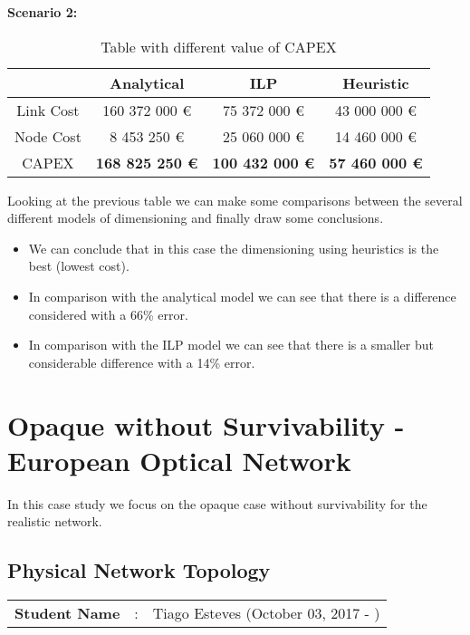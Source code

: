 \vspace{11pt}
\textbf{Scenario 2:}\\

\begin{table}[h!]
\centering
\begin{tabular}{| c | c | c | c |}
 \hline
   & Analytical & ILP & Heuristic \\
 \hline\hline
 Link Cost & 160 372 000 \euro & 75 372 000 \euro & 43 000 000 \euro \\
 Node Cost & 8 453 250 \euro & 25 060 000 \euro & 14 460 000 \euro \\
 CAPEX & \textbf{168 825 250 \euro} & \textbf{100 432 000 \euro} & \textbf{57 460 000 \euro} \\
 \hline
\end{tabular}
\caption{Table with different value of CAPEX }
\label{table_comparative_opaque_sur_ref_2}
\end{table}

\vspace{11pt}
Looking at the previous table we can make some comparisons between the several different models of dimensioning and finally draw some conclusions.

\begin{itemize}
  \item We can conclude that in this case the dimensioning using heuristics is the best (lowest cost).
  \item In comparison with the analytical model we can see that there is a difference considered with a 66\% error.
  \item In comparison with the ILP model we can see that there is a smaller but considerable difference with a 14\% error.
\end{itemize}




\newpage
\section{Opaque without Survivability - European Optical Network} \label{Realistic_Network}

In this case study we focus on the opaque case without survivability for the realistic network.

\subsection{Physical Network Topology}
\begin{tcolorbox}	
\begin{tabular}{p{2.75cm} p{0.2cm} p{10.5cm}} 	
\textbf{Student Name}  &:& Tiago Esteves    (October 03, 2017 - )\\
\end{tabular}
\end{tcolorbox}

